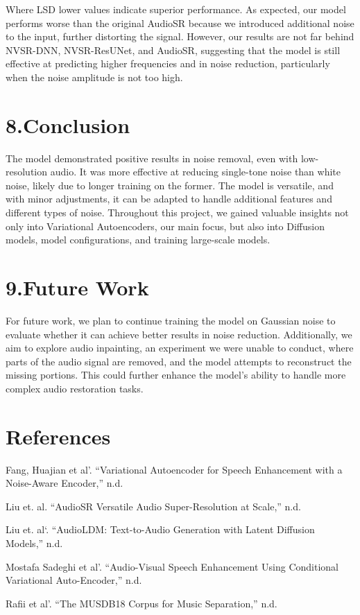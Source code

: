 \documentclass[
  ]{scrartcl}
\newlength{\cslhangindent}
\newenvironment{CSLReferences}[2] %
 {\begin{list}{}{%
  \setlength{\itemindent}{0pt}
  \setlength{\leftmargin}{0pt}
  \setlength{\parsep}{0pt}
  \ifodd #1
   \setlength{\leftmargin}{\cslhangindent}
   \setlength{\itemindent}{-1\cslhangindent}
  \fi
  \setlength{\itemsep}{#2\baselineskip}}}
 {\end{list}}
\begin{document}
Where LSD lower values indicate superior performance. As expected, our
model performs worse than the original AudioSR because we introduced
additional noise to the input, further distorting the signal. However,
our results are not far behind NVSR-DNN, NVSR-ResUNet, and AudioSR,
suggesting that the model is still effective at predicting higher
frequencies and in noise reduction, particularly when the noise
amplitude is not too high.

\section{8.Conclusion}\label{conclusion}

The model demonstrated positive results in noise removal, even with
low-resolution audio. It was more effective at reducing single-tone
noise than white noise, likely due to longer training on the former. The
model is versatile, and with minor adjustments, it can be adapted to
handle additional features and different types of noise. Throughout this
project, we gained valuable insights not only into Variational
Autoencoders, our main focus, but also into Diffusion models, model
configurations, and training large-scale models.

\section{9.Future Work}\label{future-work}

For future work, we plan to continue training the model on Gaussian
noise to evaluate whether it can achieve better results in noise
reduction. Additionally, we aim to explore audio inpainting, an
experiment we were unable to conduct, where parts of the audio signal
are removed, and the model attempts to reconstruct the missing portions.
This could further enhance the model's ability to handle more complex
audio restoration tasks.

\section{References}\label{references}

\label{refs}
\begin{CSLReferences}{1}{0}
Fang, Huajian et al'. {``Variational Autoencoder for Speech Enhancement
with a Noise-Aware Encoder,''} n.d.

Liu et. al. {``AudioSR Versatile Audio Super-Resolution at Scale,''}
n.d.

Liu et. al`. {``AudioLDM: Text-to-Audio Generation with Latent Diffusion
Models,''} n.d.

Mostafa Sadeghi et al'. {``Audio-Visual Speech Enhancement Using
Conditional Variational Auto-Encoder,''} n.d.

Rafii et al'. {``The MUSDB18 Corpus for Music Separation,''} n.d.

\end{CSLReferences}
\end{document}
